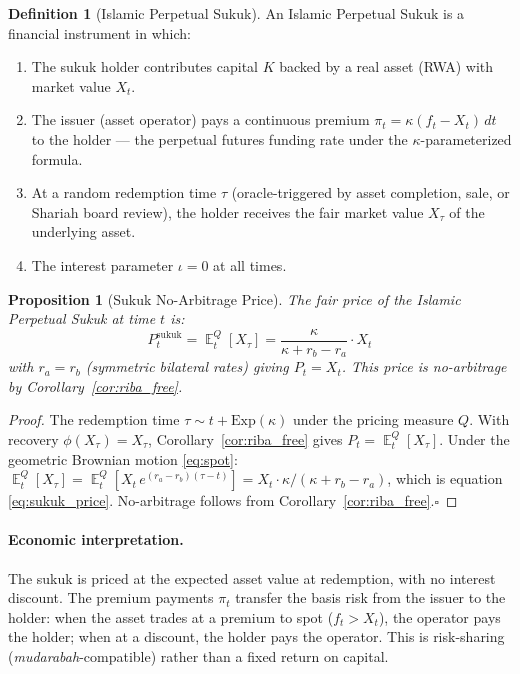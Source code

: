 \documentclass[10pt,twocolumn]{article}
\theoremstyle{plain}
\newtheorem{proposition}{Proposition}
\theoremstyle{definition}
\newtheorem{definition}{Definition}
\DeclareMathOperator{\E}{\mathbb{E}}
\begin{document}
\begin{definition}[Islamic Perpetual Sukuk]
An Islamic Perpetual Sukuk is a financial instrument in which:
\begin{enumerate}[leftmargin=*,noitemsep]
\item The sukuk holder contributes capital $K$ backed by a real
asset (RWA) with market value $X_t$.
\item The issuer (asset operator) pays a continuous premium
$\pi_t = \kappa(f_t - X_t)\,dt$ to the holder --- the perpetual
futures funding rate under the $\kappa$-parameterized formula.
\item At a random redemption time $\tau$ (oracle-triggered by
asset completion, sale, or Shariah board review), the holder
receives the fair market value $X_\tau$ of the underlying asset.
\item The interest parameter $\iota = 0$ at all times.
\end{enumerate}
\end{definition}

\begin{proposition}[Sukuk No-Arbitrage Price]
\label{prop:sukuk}
The fair price of the Islamic Perpetual Sukuk at time $t$ is:
\begin{equation}
P_t^{\mathrm{sukuk}} = \E^Q_t[X_\tau]
= \frac{\kappa}{\kappa + r_b - r_a}\cdot X_t
\label{eq:sukuk_price}
\end{equation}
with $r_a = r_b$ (symmetric bilateral rates) giving $P_t = X_t$.
This price is no-arbitrage by Corollary~\textup{\ref{cor:riba_free}}.
\end{proposition}

\begin{proof}
The redemption time $\tau \sim t + \mathrm{Exp}(\kappa)$ under
the pricing measure $Q$. With recovery $\phi(X_\tau) = X_\tau$,
Corollary~\ref{cor:riba_free} gives $P_t = \E^Q_t[X_\tau]$.
Under the geometric Brownian motion \eqref{eq:spot}:
$\E^Q_t[X_\tau] = \E^Q_t[X_t\,e^{(r_a-r_b)(\tau-t)}] =
X_t \cdot \kappa/(\kappa + r_b - r_a)$, which is equation
\eqref{eq:sukuk_price}. No-arbitrage follows from
Corollary~\ref{cor:riba_free}.\qquad$\square$
\end{proof}

\paragraph{Economic interpretation.}
The sukuk is priced at the expected asset value at redemption,
with no interest discount. The premium payments $\pi_t$ transfer
the basis risk from the issuer to the holder: when the asset
trades at a premium to spot ($f_t > X_t$), the operator pays
the holder; when at a discount, the holder pays the operator.
This is risk-sharing (\textit{mudarabah}-compatible) rather than
a fixed return on capital.
\end{document}
